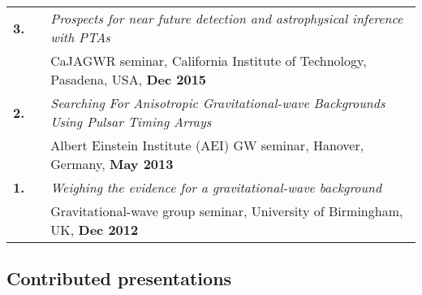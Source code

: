 \documentclass[11pt,letterpaper,sans]{moderncv}
\begin{document}
{\begin{longtable}{rp{0.3cm}p{15.8cm}}
\textbf{3.} & & \textit{Prospects for near future detection and astrophysical inference with PTAs} \\ 
&& CaJAGWR seminar, California Institute of Technology, Pasadena, USA, \textbf{Dec 2015} \vspace{0.09cm}\\
\textbf{2.} & & \textit{Searching For Anisotropic Gravitational-wave Backgrounds Using Pulsar Timing Arrays} \\ 
&& Albert Einstein Institute (AEI) GW seminar, Hanover, Germany, \textbf{May 2013} \vspace{0.09cm}\\
\textbf{1.} & & \textit{Weighing the evidence for a gravitational-wave background} \\ 
&& Gravitational-wave group seminar, University of Birmingham, UK, \textbf{Dec 2012} 
\end{longtable}
}

\subsection{Contributed presentations} \vspace{-0.3cm}
\end{document}

